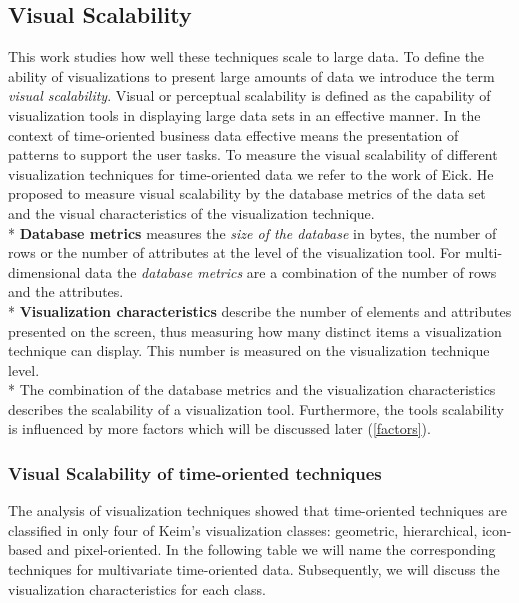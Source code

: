 \subsection{Visual Scalability}\label{scalability}

This work studies how well these techniques scale to large data. To define the ability of visualizations to present large amounts of data we introduce the term \textit{visual scalability}.
Visual or perceptual scalability is defined as the capability of visualization tools in displaying large data sets in an effective manner\cite{Eick2002}\label{effective}. In the context of time-oriented business data effective means the presentation of patterns to support the user tasks. To measure the visual scalability of different visualization techniques for time-oriented data we refer to the work of Eick\cite{Eick2002}. He proposed to measure visual scalability by the database metrics of the data set and the visual characteristics of the visualization technique. \\*
\textbf{Database metrics}\label{databasemetrics} measures the \textit{size of the database} in bytes, the number of rows or the number of attributes at the level of the visualization tool. For multi-dimensional data the \textit{database metrics} are a combination of the number of rows and the attributes. \\*
\textbf{Visualization characteristics} describe the number of elements and attributes presented on the screen, thus measuring how many distinct items a visualization technique can display. This number is measured on the visualization technique level.\\*
The combination of the database metrics and the visualization characteristics describes the scalability of a visualization tool. Furthermore, the tools scalability is influenced by more factors which will be discussed later (\ref{factors}).

\subsubsection{Visual Scalability of time-oriented techniques}\label{visualization}
The analysis of visualization techniques showed that time-oriented techniques are classified in only four of Keim's visualization classes: geometric, hierarchical, icon-based and pixel-oriented. In the following table we will name the corresponding techniques for multivariate time-oriented data. Subsequently, we will discuss the visualization characteristics for each class. 


